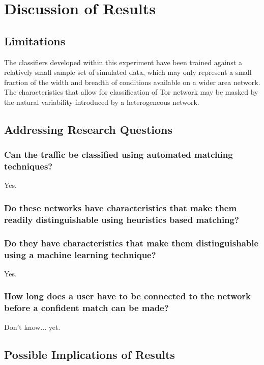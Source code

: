 \documentclass{ecuthesis}
\begin{document}
\chapter{Discussion of Results}

\section{Limitations}

The classifiers developed within this experiment have been trained against
a relatively small sample set of simulated data, which may only represent
a small fraction of the width and breadth of conditions available on a wider
area network. The characteristics that allow for classification of Tor network
may be masked by the natural variability introduced by a heterogeneous network.

\section{Addressing Research Questions}

\subsection{Can the traffic be classified using automated matching techniques?}

Yes.

\subsection{Do these networks have characteristics that make them readily
distinguishable using heuristics based matching?}

\subsection{Do they have characteristics that make them distinguishable using a
machine learning technique?}

Yes.

\subsection{How long does a user have to be connected to the network before a
confident match can be made?}

Don't know... yet.

\section{Possible Implications of Results}
\end{document}
